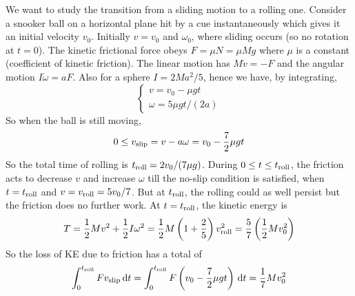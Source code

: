 \begin{example}
    We want to study the transition from a sliding motion to a rolling one.
    Consider a snooker ball on a horizontal plane hit by a cue instantaneously which gives it an initial velocity $v_0$.
    Initially $v=v_0$ and $\omega_0$, where sliding occurs (so no rotation at $t=0$).
    The kinetic frictional force obeys $F=\mu N=\mu Mg$ where $\mu$ is a constant (coefficient of kinetic friction).
    The linear motion has $M\dot{v}=-F$ and the angular motion $I\dot\omega=aF$.
    Also for a sphere $I=2Ma^2/5$, hence we have, by integrating,
    $$\begin{cases}
        v=v_0-\mu gt\\
        \omega=5\mu gt/(2a)
    \end{cases}$$
    So when the ball is still moving,
    $$0\le v_{\rm slip}=v-a\omega=v_0-\frac{7}{2}\mu gt$$
    So the total time of rolling is $t_{\rm roll}=2v_0/(7\mu g)$.
    During $0\le t\le t_{\rm roll}$, the friction acts to decrease $v$ and increase $\omega$ till the no-slip condition is satisfied, when $t=t_{\rm roll}$ and $v=v_{\rm roll}=5v_0/7$.
    But at $t_{\rm roll}$, the rolling could as well persist but the friction does no further work.
    At $t=t_{\rm roll}$, the kinetic energy is
    $$T=\frac{1}{2}Mv^2+\frac{1}{2}I\omega^2=\frac{1}{2}M\left( 1+\frac{2}{5} \right)v_{\rm roll}^2=\frac{5}{7}\left( \frac{1}{2}Mv_0^2 \right)$$
    So the loss of KE due to friction has a total of
    $$\int_0^{t_{\rm roll}}Fv_{\rm slip}\,\mathrm dt=\int_0^{t_{\rm roll}}F\left( v_0-\frac{7}{2}\mu gt \right)\,\mathrm dt=\frac{1}{7}Mv_0^2$$
\end{example}
